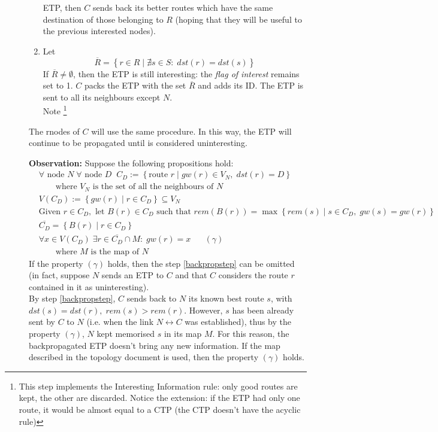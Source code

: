 \documentclass[a4paper]{article}
\newcommand{\T}[1]{\textrm{#1}}
\newcommand{\pgra}[1]{\left\{#1\right\}}
\newcommand{\eal}[1]{{\begin{align*} #1 \end{align*}}}
\def\ove#1{{\overline{#1}}}
\newcommand{\qq}{\qquad}
\def\0{{\emptyset}}
\def\^{{\cap}}
\def\({{\subseteq}}
\def\'{{\;\;\;}}
\begin{document}
\begin{description}
\begin{enumerate}
		ETP, then $C$ sends back its better routes which have the same destination of
		those belonging to $R$ (hoping that they will be useful to the
		previous interested nodes).
	\item 	Let \[\ove R=\pgra{r\in R\;|\;\nexists s\in S:\;dst(r)=dst(s)}\] 
		If $\ove R \neq \0$, then the ETP is still interesting: 
		the \emph{flag of interest} remains set to 1.
		$C$ packs the ETP with the set $\ove R$ and adds its ID.
		The ETP is sent to all its neighbours except $N$.\\
		Note \footnote{This step implements the Interesting
		Information rule: only
		good routes are kept, the other are discarded. Notice
		the extension: if the ETP had only one route, it would be
		almost equal to a CTP (the CTP doesn't have the acyclic rule)}
	\end{enumerate}
	The rnodes of $C$ will use the same procedure. In this way, the ETP
	will continue to be propagated until is considered uninteresting.

	\textbf{Observation: }Suppose the following propositions hold:
	\eal{
	&\forall \T{ node }N\;\forall \T{ node }D\;\;
	C_D:= \pgra{\T{route }r\;|\;gw(r)\in V_N,\;dst(r)=D}\\
	&\qq\T{where $V_N$ is the set of all the neighbours of $N$}\\
	&V(C_D):=\pgra{gw(r)\;|\;r\in C_D} \( V_N\\
	&\T{Given } r \in C_D, \T{ let } B(r)\in C_D \T{ such that } 
	rem(B(r))=\max\pgra{rem(s)\;|\;s\in C_D,\;gw(s)=gw(r)}\\
	&\ove {C_D} = \pgra{B(r)\;|\;r\in C_D}\\
	&\forall x\in V(C_D)\;\exists r\in
	\ove{C_D}\^M:\;gw(r)=x\'\'(\gamma)\\
	&\qq\T{where $M$ is the map of $N$}
	}
	If the property $(\gamma)$ holds, then the step \ref{backpropstep}
	can be omitted (in fact, suppose $N$ sends an ETP to $C$ and that $C$
	considers the route $r$ contained in it as uninteresting).\\
	By step \ref{backpropstep}, $C$ sends back to $N$ its known best route
	$s$, with $dst(s)=dst(r),\;rem(s)>rem(r)$. However, $s$ has been
	already sent by $C$ to $N$ (i.e. when the link $N\leftrightarrow C$
	was established), thus by the property $(\gamma)$, $N$ kept memorised
	$s$ in its map $M$. For this reason, the backpropagated ETP doesn't
	bring any new information. If the map described in the topology
	document\cite{ntktopology} is used, then the property $(\gamma)$
	holds.
	

\end{description}
\end{document}
